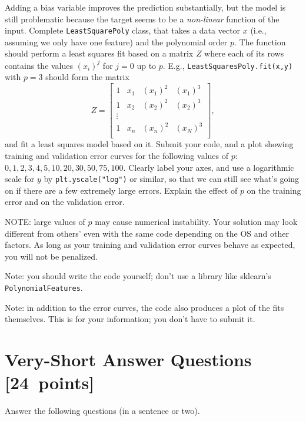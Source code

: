 \documentclass{article}
\newcommand{\blu}[1]{{\textcolor{blu}{#1}}}
\let\ask\blu
\newcommand\pts[1]{\textcolor{pointscolour}{[#1~points]}}
\begin{document}
Adding a bias variable improves the prediction substantially, but the model is still problematic because the target seems to be a \emph{non-linear} function of the input.
Complete \texttt{LeastSquarePoly} class, that takes a data vector $x$ (i.e., assuming we only have one feature) and the polynomial order $p$. The function should perform a least squares fit based on a matrix $Z$ where each of its rows contains the values $(x_{i})^j$ for $j=0$ up to $p$. E.g., \texttt{LeastSquaresPoly.fit(x,y)}  with $p = 3$ should form the matrix
\[
Z =
\left[\begin{array}{cccc}
1 & x_1 & (x_1)^2 & (x_1)^3\\
1 & x_2 & (x_2)^2 & (x_2)^3\\
\vdots\\
1 & x_n & (x_n)^2 & (x_N)^3\\
\end{array}
\right],
\]
and fit a least squares model based on it.
\ask{Submit your code, and a plot showing training and validation error curves for the following values of $p$: $0,1,2,3,4,5,10,20,30,50,75,100$. Clearly label your axes, and use a logarithmic scale for $y$} by \texttt{plt.yscale("log")} or similar, so that we can still see what's going on if there are a few extremely large errors. \ask{Explain the effect of $p$ on the training error and on the validation error.}

NOTE: large values of $p$ may cause numerical instability. Your solution may look different from others' even with the same code depending on the OS and other factors. As long as your training and validation error curves behave as expected, you will not be penalized.

Note: you should write the code yourself; don't use a library like sklearn's \texttt{PolynomialFeatures}.

Note: in addition to the error curves, the code also produces a plot of the fits themselves. This is for your information; you don't have to submit it.




\clearpage
\section{Very-Short Answer Questions \pts{24}}

\ask{Answer the following questions (in a sentence or two).}
\end{document}
